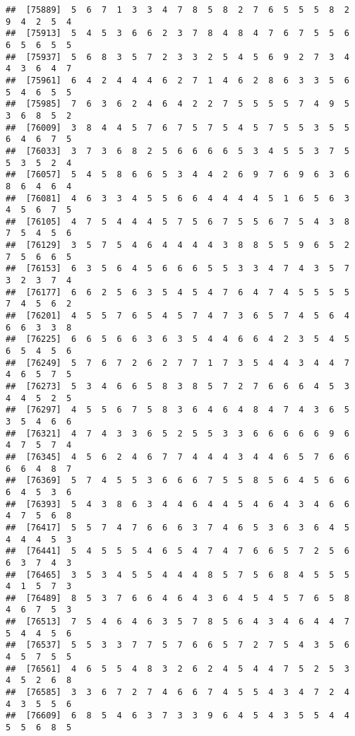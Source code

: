 \documentclass[
]{book}
\begin{document}
\begin{verbatim}
##  [75889]  5  6  7  1  3  3  4  7  8  5  8  2  7  6  5  5  5  8  2  9  4  2  5  4
##  [75913]  5  4  5  3  6  6  2  3  7  8  4  8  4  7  6  7  5  5  6  6  5  6  5  5
##  [75937]  5  6  8  3  5  7  2  3  3  2  5  4  5  6  9  2  7  3  4  4  3  6  4  7
##  [75961]  6  4  2  4  4  4  6  2  7  1  4  6  2  8  6  3  3  5  6  5  4  6  5  5
##  [75985]  7  6  3  6  2  4  6  4  2  2  7  5  5  5  5  7  4  9  5  3  6  8  5  2
##  [76009]  3  8  4  4  5  7  6  7  5  7  5  4  5  7  5  5  3  5  5  6  4  6  7  5
##  [76033]  3  7  3  6  8  2  5  6  6  6  6  5  3  4  5  5  3  7  5  5  3  5  2  4
##  [76057]  5  4  5  8  6  6  5  3  4  4  2  6  9  7  6  9  6  3  6  8  6  4  6  4
##  [76081]  4  6  3  3  4  5  5  6  6  4  4  4  4  5  1  6  5  6  3  4  5  6  7  5
##  [76105]  4  7  5  4  4  4  5  7  5  6  7  5  5  6  7  5  4  3  8  7  5  4  5  6
##  [76129]  3  5  7  5  4  6  4  4  4  4  3  8  8  5  5  9  6  5  2  7  5  6  6  5
##  [76153]  6  3  5  6  4  5  6  6  6  5  5  3  3  4  7  4  3  5  7  3  2  3  7  4
##  [76177]  6  6  2  5  6  3  5  4  5  4  7  6  4  7  4  5  5  5  5  7  4  5  6  2
##  [76201]  4  5  5  7  6  5  4  5  7  4  7  3  6  5  7  4  5  6  4  6  6  3  3  8
##  [76225]  6  6  5  6  6  3  6  3  5  4  4  6  6  4  2  3  5  4  5  6  5  4  5  6
##  [76249]  5  7  6  7  2  6  2  7  7  1  7  3  5  4  4  3  4  4  7  4  6  5  7  5
##  [76273]  5  3  4  6  6  5  8  3  8  5  7  2  7  6  6  6  4  5  3  4  4  5  2  5
##  [76297]  4  5  5  6  7  5  8  3  6  4  6  4  8  4  7  4  3  6  5  3  5  4  6  6
##  [76321]  4  7  4  3  3  6  5  2  5  5  3  3  6  6  6  6  6  9  6  4  7  5  7  4
##  [76345]  4  5  6  2  4  6  7  7  4  4  4  3  4  4  6  5  7  6  6  6  6  4  8  7
##  [76369]  5  7  4  5  5  3  6  6  6  7  5  5  8  5  6  4  5  6  6  6  4  5  3  6
##  [76393]  5  4  3  8  6  3  4  4  6  4  4  5  4  6  4  3  4  6  6  4  7  5  6  8
##  [76417]  5  5  7  4  7  6  6  6  3  7  4  6  5  3  6  3  6  4  5  4  4  4  5  3
##  [76441]  5  4  5  5  5  4  6  5  4  7  4  7  6  6  5  7  2  5  6  6  3  7  4  3
##  [76465]  3  5  3  4  5  5  4  4  4  8  5  7  5  6  8  4  5  5  5  4  1  5  7  3
##  [76489]  8  5  3  7  6  6  4  6  4  3  6  4  5  4  5  7  6  5  8  4  6  7  5  3
##  [76513]  7  5  4  6  4  6  3  5  7  8  5  6  4  3  4  6  4  4  7  5  4  4  5  6
##  [76537]  5  5  3  3  7  7  5  7  6  6  5  7  2  7  5  4  3  5  6  4  5  7  5  5
##  [76561]  4  6  5  5  4  8  3  2  6  2  4  5  4  4  7  5  2  5  3  4  5  2  6  8
##  [76585]  3  3  6  7  2  7  4  6  6  7  4  5  5  4  3  4  7  2  4  4  3  5  5  6
##  [76609]  6  8  5  4  6  3  7  3  3  9  6  4  5  4  3  5  5  4  4  5  5  6  8  5

\end{verbatim}
\end{document}
